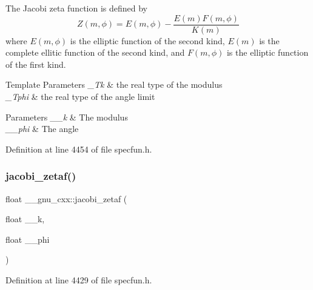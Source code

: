 The Jacobi zeta function is defined by \[ Z(m,\phi) = E(m,\phi) - \frac{E(m)F(m,\phi)}{K(m)} \] where $ E(m,\phi) $ is the elliptic function of the second kind, $ E(m) $ is the complete ellitic function of the second kind, and $ F(m,\phi) $ is the elliptic function of the first kind.


\begin{DoxyTemplParams}{Template Parameters}
{\em \+\_\+\+Tk} & the real type of the modulus \\
\hline
{\em \+\_\+\+Tphi} & the real type of the angle limit \\
\hline
\end{DoxyTemplParams}

\begin{DoxyParams}{Parameters}
{\em \+\_\+\+\_\+k} & The modulus \\
\hline
{\em \+\_\+\+\_\+phi} & The angle \\
\hline
\end{DoxyParams}


Definition at line 4454 of file specfun.\+h.

\mbox{\label{group__gnu__math__spec__func_gaedb6b352331c67b9dea73660e2045668}} 
\subsubsection{\texorpdfstring{jacobi\+\_\+zetaf()}{jacobi\_zetaf()}}
{\footnotesize\ttfamily float \+\_\+\+\_\+gnu\+\_\+cxx\+::jacobi\+\_\+zetaf (\begin{DoxyParamCaption}\item[{float}]{\+\_\+\+\_\+k,  }\item[{float}]{\+\_\+\+\_\+phi }\end{DoxyParamCaption})\hspace{0.3cm}{\ttfamily [inline]}}



Definition at line 4429 of file specfun.\+h.

\mbox{\label{group__gnu__math__spec__func_ga9db158df9459aa12c840724338753913}} 
